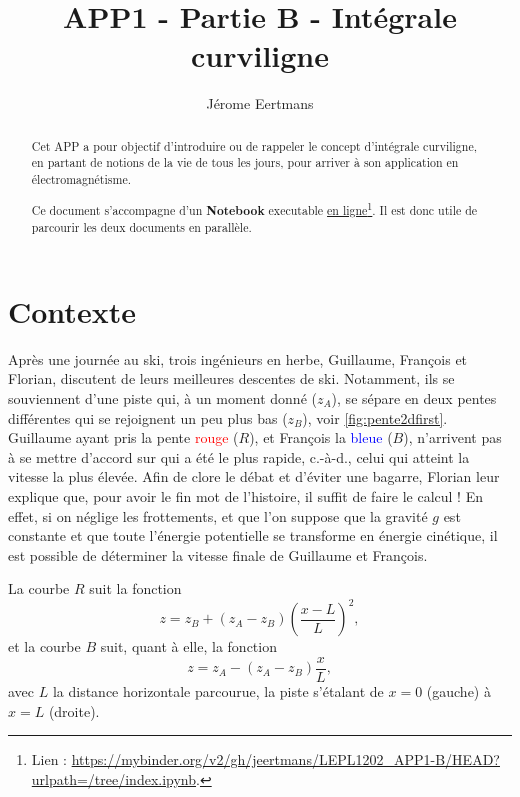 \documentclass{cup-pan}
\author{Jérome Eertmans}
\title{APP1 - Partie B - Intégrale curviligne}
\date{}
\begin{document}
\maketitle

\begin{abstract}

Cet APP a pour objectif d'introduire ou de rappeler le concept d'intégrale curviligne, en partant de notions de la vie de tous les jours, pour arriver à son application en électromagnétisme.

Ce document s'accompagne d'un \textbf{Notebook} executable \href{https://mybinder.org/v2/gh/jeertmans/LEPL1202_APP1-B/HEAD?urlpath=/tree/index.ipynb}{en ligne}\footnote{Lien : \url{https://mybinder.org/v2/gh/jeertmans/LEPL1202_APP1-B/HEAD?urlpath=/tree/index.ipynb}.}. Il est donc utile de parcourir les deux documents en parallèle.


\end{abstract}

\section{Contexte}

Après une journée au ski, trois ingénieurs en herbe, Guillaume, François et Florian, discutent de leurs meilleures descentes de ski. Notamment, ils se souviennent d'une piste qui, à un moment donné ($z_A$), se sépare en deux pentes différentes qui se rejoignent un peu plus bas ($z_B$), voir \autoref{fig:pente2dfirst}. Guillaume ayant pris la pente \textcolor{red}{rouge} ($R$), et François la \textcolor{blue}{bleue} ($B$), n'arrivent pas à se mettre d'accord sur qui a été le plus rapide, c.-à-d., celui qui atteint la vitesse la plus élevée. Afin de clore le débat et d'éviter une bagarre, Florian leur explique que, pour avoir le fin mot de l'histoire, il suffit de faire le calcul ! En effet, si on néglige les frottements, et que l'on suppose que la gravité $g$ est constante et que toute l'énergie potentielle se transforme en énergie cinétique, il est possible de déterminer la vitesse finale de Guillaume et François.

La courbe $R$ suit la fonction
\begin{equation}
    z = z_B + (z_A - z_B)\left(\frac{x-L}{L}\right)^2,
\end{equation}
et la courbe $B$ suit, quant à elle, la fonction
\begin{equation}
    z = z_A - (z_A - z_B)\frac{x}{L},
\end{equation}
avec $L$ la distance horizontale parcourue, la piste s'étalant de $x=0$ (gauche) à $x=L$ (droite).
\end{document}
